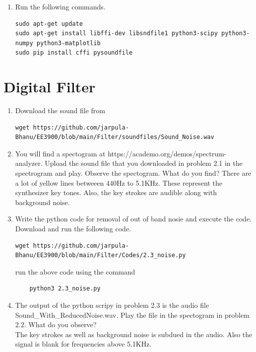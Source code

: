 \documentclass[journal,12pt,twocolumn]{IEEEtran}
\renewcommand\thesection{\arabic{section}}
\begin{document}
\begin{enumerate}[label=\thesection.\arabic*
,ref=\thesection.\theenumi]
\item Run the following commands.
\begin{lstlisting}
sudo apt-get update
sudo apt-get install libffi-dev libsndfile1 python3-scipy python3-numpy python3-matplotlib
sudo pip install cffi pysoundfile
\end{lstlisting}
\end{enumerate}

\section{Digital Filter}

\begin{enumerate}[label=\thesection.\arabic*
,ref=\thesection.\theenumi]
\item Download the sound file from
\begin{lstlisting}
wget https://github.com/jarpula-Bhanu/EE3900/blob/main/Filter/soundfiles/Sound_Noise.wav
\end{lstlisting}

\item You will find a spectogram at https://academo.org/demos/spectrum-analyzer. Upload the sound file that you downloaded in problem 2.1 in the spectrogram and play. Observe the spectogram. What do you find?
\solution There are a lot of yellow lines betweeen 440Hz to 5.1KHz. These represent the synthesizer key tones. Also, the key strokes are audible along with background noise.

\item Write the python code for removal of out of band nosie and execute the code.\label{2.3}\\
\solution Download and run the following code.
\begin{lstlisting}
wget https://github.com/jarpula-Bhanu/EE3900/blob/main/Filter/Codes/2.3_noise.py
\end{lstlisting}
run the above code using the command
\begin{lstlisting}
	python3 2.3_noise.py
\end{lstlisting}

\item The output of the python scripy in problem 2.3 is the audio file Sound\_With\_ReducedNoise.wav. Play the file in the spectogram in problem 2.2. What do you observe?\\
\solution The key strokes as well as background noise is subdued in the audio. Also the signal is blank for frequencies above 5.1KHz.
\end{enumerate}
\end{document}

